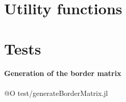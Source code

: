 \documentclass[11pt,oneside]{article}	%
\begin{document}
\section{Utility functions}


\section{Tests}\label{sec:tests}

\paragraph{Generation of the border matrix}
@O test/generateBorderMatrix.jl
\end{document}
